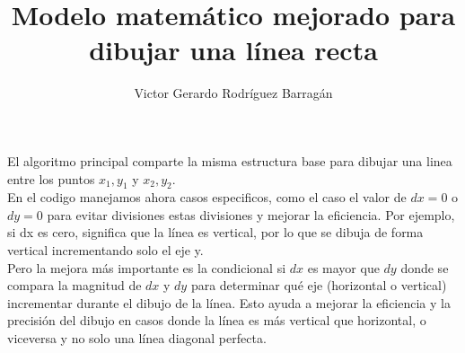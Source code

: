 \documentclass{article}
\title{Modelo matemático mejorado para dibujar una línea recta}
\author{Victor Gerardo Rodríguez Barragán}
\date{}
\begin{document}
\maketitle
\justify

El algoritmo principal comparte la misma estructura base
para dibujar una linea entre los puntos $x_1,y_1$ y $x_2,y_2$.
\vspace{0.25cm}\\
En el codigo manejamos ahora casos especificos, como el caso
el valor de $dx = 0$ o $dy = 0$ para evitar divisiones estas
divisiones y mejorar la eficiencia. Por ejemplo, si dx es cero,
significa que la línea es vertical, por lo que se dibuja de
forma vertical incrementando solo el eje y.
\vspace{0.25cm}\\
Pero la mejora más importante es la condicional si $dx$ es mayor que $dy$ donde
se compara la magnitud de $dx$ y $dy$ para determinar qué eje (horizontal o vertical)
incrementar durante el dibujo de la línea. Esto ayuda a mejorar la eficiencia y la precisión del dibujo
en casos donde la línea es más vertical que horizontal, o viceversa y no solo una línea diagonal perfecta.
\end{document}

